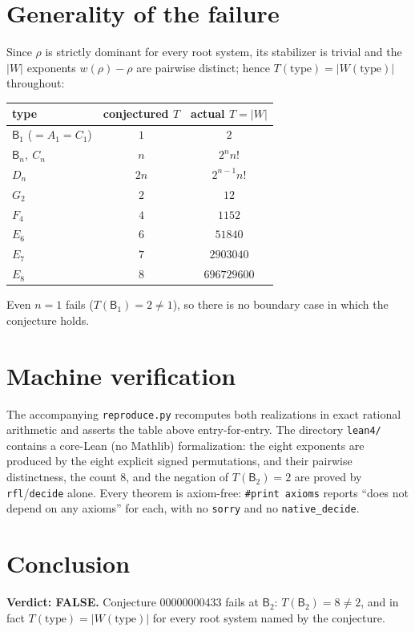 \documentclass[11pt]{article}
\newcommand{\BB}{\mathsf{B}}
\newcommand{\WW}{W}
\begin{document}
\section{Generality of the failure}

Since $\rho$ is strictly dominant for every root system, its stabilizer is
trivial and the $|\WW|$ exponents $w(\rho)-\rho$ are pairwise distinct; hence
$T(\mathrm{type})=|\WW(\mathrm{type})|$ throughout:

\begin{center}
\begin{tabular}{lcc}
\toprule
type & conjectured $T$ & actual $T=|\WW|$ \\
\midrule
$\BB_1$ ($=A_1=C_1$) & $1$ & $2$ \\
$\BB_n,\ C_n$        & $n$ & $2^n n!$ \\
$D_n$                & $2n$ & $2^{n-1} n!$ \\
$G_2$                & $2$ & $12$ \\
$F_4$                & $4$ & $1152$ \\
$E_6$                & $6$ & $51840$ \\
$E_7$                & $7$ & $2903040$ \\
$E_8$                & $8$ & $696729600$ \\
\bottomrule
\end{tabular}
\end{center}

Even $n=1$ fails ($T(\BB_1)=2\neq1$), so there is no boundary case in which
the conjecture holds.

\section{Machine verification}

The accompanying \texttt{reproduce.py} recomputes both realizations in exact
rational arithmetic and asserts the table above entry-for-entry. The
directory \texttt{lean4/} contains a core-Lean (no Mathlib) formalization:
the eight exponents are produced by the eight explicit signed permutations,
and their pairwise distinctness, the count $8$, and the negation of
$T(\BB_2)=2$ are proved by \texttt{rfl}/\texttt{decide} alone. Every theorem
is axiom-free: \texttt{\#print axioms} reports ``does not depend on any
axioms'' for each, with no \texttt{sorry} and no \texttt{native\_decide}.

\section{Conclusion}

\textbf{Verdict: FALSE.} Conjecture 00000000433 fails at $\BB_2$:
$T(\BB_2)=8\neq 2$, and in fact $T(\mathrm{type})=|\WW(\mathrm{type})|$
for every root system named by the conjecture.
\end{document}

